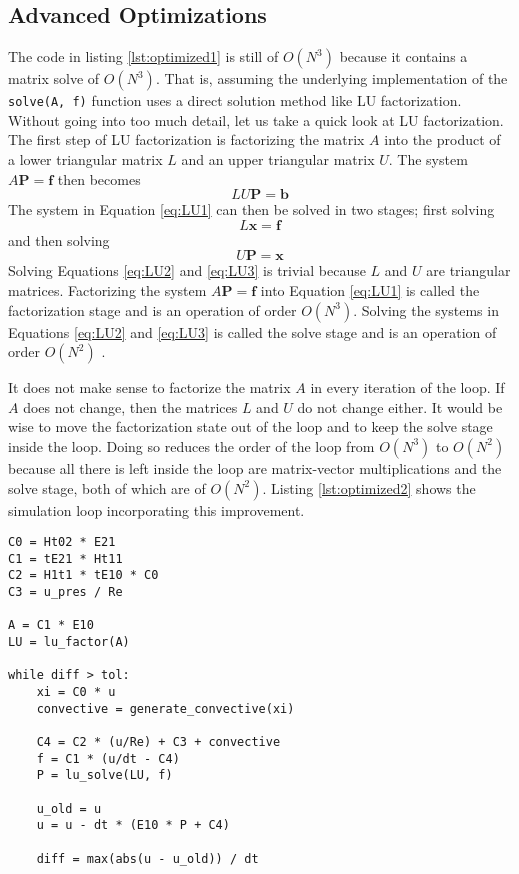 \subsection{Advanced Optimizations}

The code in listing \ref{lst:optimized1} is still of $O(N^3)$ because it contains a matrix solve of $O(N^3)$. That is, assuming the underlying implementation of the \lstinline|solve(A, f)| function uses a direct solution method like LU factorization. Without going into too much detail, let us take a quick look at LU factorization. The first step of LU factorization is factorizing the matrix $A$ into the product of a lower triangular matrix $L$ and an upper triangular matrix $U$. The system $A \mathbf{P} = \mathbf{f}$ then becomes
\begin{equation}
    \label{eq:LU1}
    LU \mathbf{P} = \mathbf{b}
\end{equation}
The system in Equation \eqref{eq:LU1} can then be solved in two stages; first  solving
\begin{equation}
    \label{eq:LU2}
    L \mathbf{x} = \mathbf{f}
\end{equation}
and then solving
\begin{equation}
    \label{eq:LU3}
    U \mathbf{P} = \mathbf{x}
\end{equation}
Solving Equations \eqref{eq:LU2} and \eqref{eq:LU3} is trivial because $L$ and $U$ are triangular matrices. Factorizing the system $A \mathbf{P} = \mathbf{f}$ into  Equation \eqref{eq:LU1} is called the factorization stage and is an operation of order $O(N^3)$. Solving the systems in Equations \eqref{eq:LU2} and \eqref{eq:LU3} is called the solve stage and is an operation of order $O(N^2)$ \parencite{golub2012matrix}.

It does not make sense to factorize the matrix $A$ in every iteration of the loop. If $A$ does not change, then the matrices $L$ and $U$ do not change either. It would be wise to move the factorization state out of the loop and to keep the solve stage inside the loop. Doing so reduces the order of the loop from $O(N^3)$ to $O(N^2)$ because all there is left inside the loop are matrix-vector multiplications and the solve stage, both of which are of $O(N^2)$. Listing \ref{lst:optimized2} shows the simulation loop incorporating this improvement.

\begin{lstlisting}[caption=Code excerpt after moving the factorization stage., label=lst:optimized2]
C0 = Ht02 * E21
C1 = tE21 * Ht11
C2 = H1t1 * tE10 * C0
C3 = u_pres / Re

A = C1 * E10
LU = lu_factor(A)

while diff > tol:
    xi = C0 * u
    convective = generate_convective(xi)
    
    C4 = C2 * (u/Re) + C3 + convective
    f = C1 * (u/dt - C4)
    P = lu_solve(LU, f)
    
    u_old = u
    u = u - dt * (E10 * P + C4)
    
    diff = max(abs(u - u_old)) / dt
\end{lstlisting}

